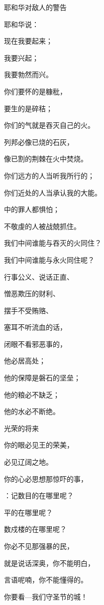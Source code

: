 {\par }{\SH 耶和华对敌人的警告
\par }{\Q {}耶和华说：
\par }{\Q 现在我要起来；
\par }{\Q 我要兴起；
\par }{\Q 我要勃然而兴。
\par }{\Q {}你们要怀的是糠秕，
\par }{\Q 要生的是碎秸；
\par }{\Q 你们的气就是吞灭自己的火。
\par }{\Q {}列邦必像已烧的石灰，
\par }{\Q 像已割的荆棘在火中焚烧。
\par }{\Q {}你们远方的人当听我所行的；
\par }{\Q 你们近处的人当承认我的大能。
\par }{\Q {}中的罪人都惧怕；
\par }{\Q 不敬虔的人被战兢抓住。
\par }{\Q 我们中间谁能与吞灭的火同住？
\par }{\Q 我们中间谁能与永火同住呢？
\par }{\Q {}行事公义、说话正直、
\par }{\Q 憎恶欺压的财利、
\par }{\Q 摆手不受贿赂、
\par }{\Q 塞耳不听流血的话，
\par }{\Q 闭眼不看邪恶事的，
\par }{\Q {}他必居高处；
\par }{\Q 他的保障是磐石的坚垒；
\par }{\Q 他的粮必不缺乏；
\par }{\Q 他的水必不断绝。
\par }{\SH 光荣的将来
\par }{\Q {}你的眼必见王的荣美，
\par }{\Q 必见辽阔之地。
\par }{\Q {}你的心必思想那惊吓的事，
\par }{：记数目的在哪里呢？
\par }{\Q 平{}的在哪里呢？
\par }{\Q 数戍楼的在哪里呢？
\par }{\Q {}你必不见那强暴的民，
\par }{\Q 就是说话深奥，你不能明白，
\par }{\Q 言语呢喃，你不能懂得的。
\par }{\Q {}你要看{}—我们守圣节的城！
}
